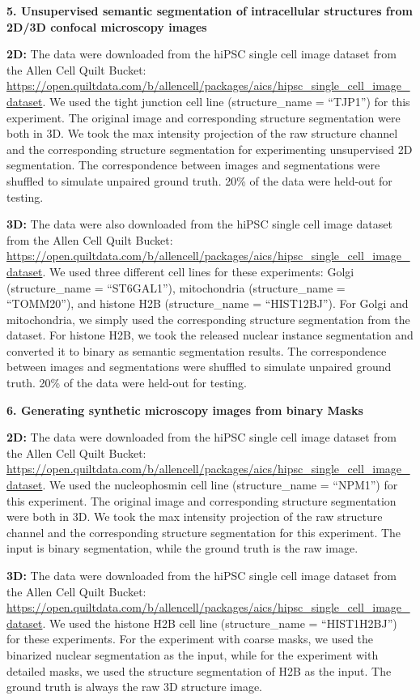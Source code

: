 \textbf{5. Unsupervised semantic segmentation of intracellular structures from 2D/3D confocal microscopy images}

\textbf{2D:} The data were downloaded from the hiPSC single cell image dataset from the Allen Cell Quilt Bucket: \url{https://open.quiltdata.com/b/allencell/packages/aics/hipsc_single_cell_image_dataset}. We used the tight junction cell line (structure\_name = ``TJP1'') for this experiment. The original image and corresponding structure segmentation were both in 3D. We took the max intensity projection of the raw structure channel and the corresponding structure segmentation for experimenting unsupervised 2D segmentation. The correspondence between images and segmentations were shuffled to simulate unpaired ground truth. 20\% of the data were held-out for testing.

\textbf{3D:} The data were also downloaded from the hiPSC single cell image dataset from the Allen Cell Quilt Bucket: \url{https://open.quiltdata.com/b/allencell/packages/aics/hipsc_single_cell_image_dataset}. We used three different cell lines for these experiments: Golgi (structure\_name = ``ST6GAL1''), mitochondria (structure\_name = ``TOMM20''), and histone H2B (structure\_name = ``HIST12BJ''). For Golgi and mitochondria, we simply used the corresponding structure segmentation from the dataset. For histone H2B, we took the released nuclear instance segmentation and converted it to binary as semantic segmentation results. The correspondence between images and segmentations were shuffled to simulate unpaired ground truth. 20\% of the data were held-out for testing.

\textbf{6. Generating synthetic microscopy images from binary Masks}

\textbf{2D:} The data were downloaded from the hiPSC single cell image dataset from the Allen Cell Quilt Bucket: \url{https://open.quiltdata.com/b/allencell/packages/aics/hipsc_single_cell_image_dataset}. We used the nucleophosmin cell line (structure\_name = ``NPM1'') for this experiment. The original image and corresponding structure segmentation were both in 3D. We took the max intensity projection of the raw structure channel and the corresponding structure segmentation for this experiment. The input is binary segmentation, while the ground truth is the raw image.

\textbf{3D:} The data were downloaded from the hiPSC single cell image dataset from the Allen Cell Quilt Bucket: \url{https://open.quiltdata.com/b/allencell/packages/aics/hipsc_single_cell_image_dataset}. We used the histone H2B cell line (structure\_name = ``HIST1H2BJ'') for these experiments. For the experiment with coarse masks, we used the binarized nuclear segmentation as the input, while for the experiment with detailed masks, we used the structure segmentation of H2B as the input. The ground truth is always the raw 3D structure image.

